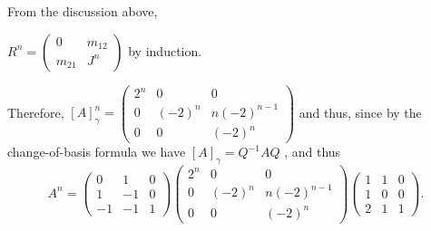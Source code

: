 \documentclass[11pt]{scrartcl}
\begin{document}
\begin{soln}
From the discussion above, 

$R^n =
 \begin{pmatrix}
0 & m_{12}\\
m_{21} & J^{n}
\end{pmatrix}$ by induction.

Therefore, $[A]_{\gamma}^n = 
\begin{pmatrix}
2^n & 0 & 0\\
0 & (-2)^n & n(-2)^{n-1}\\
0 & 0 & (-2)^n
\end{pmatrix}$ and thus, since by the change-of-basis formula  we have $[A]_{\gamma} = Q^{-1}A Q$ , and thus
\begin{equation*}
A^{n} = \begin{pmatrix}
0 & 1 & 0\\
1 & -1 & 0\\
-1 & -1 & 1
\end{pmatrix}
\begin{pmatrix}
2^n & 0 & 0\\
0 & (-2)^n & n(-2)^{n-1}\\
0 & 0 & (-2)^n
\end{pmatrix}
\begin{pmatrix}
1 & 1 & 0\\
1 & 0 & 0\\
2 & 1 & 1 
\end{pmatrix}.
\end{equation*}
\end{soln}
\end{document}

